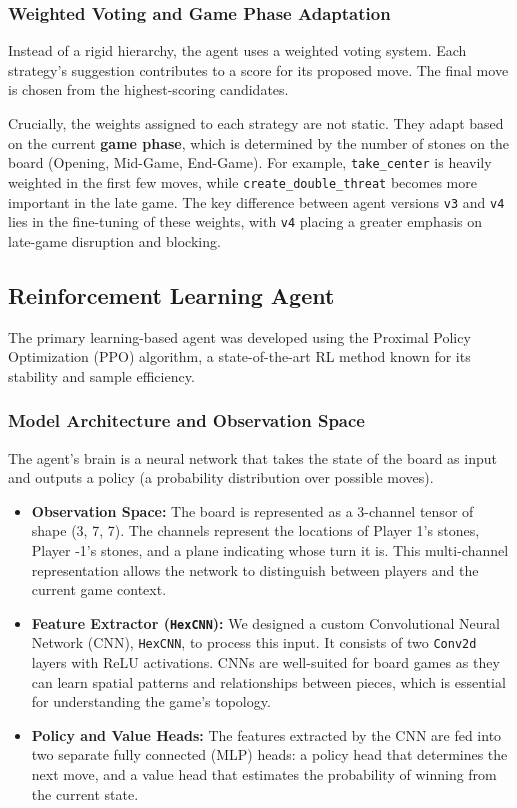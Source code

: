 \documentclass[conference]{IEEEtran}
\begin{document}
\subsubsection{Weighted Voting and Game Phase Adaptation}
Instead of a rigid hierarchy, the agent uses a weighted voting system. Each strategy's suggestion contributes to a score for its proposed move. The final move is chosen from the highest-scoring candidates.

Crucially, the weights assigned to each strategy are not static. They adapt based on the current \textbf{game phase}, which is determined by the number of stones on the board (Opening, Mid-Game, End-Game). For example, \texttt{take\_center} is heavily weighted in the first few moves, while \texttt{create\_double\_threat} becomes more important in the late game. The key difference between agent versions \texttt{v3} and \texttt{v4} lies in the fine-tuning of these weights, with \texttt{v4} placing a greater emphasis on late-game disruption and blocking.

\subsection{Reinforcement Learning Agent}
The primary learning-based agent was developed using the Proximal Policy Optimization (PPO) algorithm, a state-of-the-art RL method known for its stability and sample efficiency.

\subsubsection{Model Architecture and Observation Space}
The agent's brain is a neural network that takes the state of the board as input and outputs a policy (a probability distribution over possible moves).
\begin{itemize}
    \item \textbf{Observation Space:} The board is represented as a 3-channel tensor of shape (3, 7, 7). The channels represent the locations of Player 1's stones, Player -1's stones, and a plane indicating whose turn it is. This multi-channel representation allows the network to distinguish between players and the current game context.
    \item \textbf{Feature Extractor (\texttt{HexCNN}):} We designed a custom Convolutional Neural Network (CNN), \texttt{HexCNN}, to process this input. It consists of two \texttt{Conv2d} layers with ReLU activations. CNNs are well-suited for board games as they can learn spatial patterns and relationships between pieces, which is essential for understanding the game's topology.
    \item \textbf{Policy and Value Heads:} The features extracted by the CNN are fed into two separate fully connected (MLP) heads: a policy head that determines the next move, and a value head that estimates the probability of winning from the current state.
\end{itemize}
\end{document}
